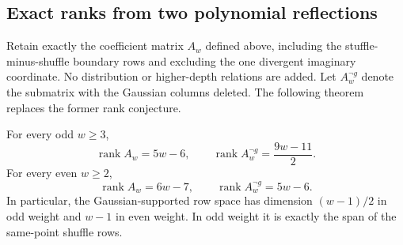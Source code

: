 
\subsection{Exact ranks from two polynomial reflections}
\label{l4rank:sec:rank}
Retain exactly the coefficient matrix $A_w$ defined above, including the
stuffle-minus-shuffle boundary rows and excluding the one divergent imaginary
coordinate. No distribution or higher-depth relations are added. Let
$A_w^{\neg g}$ denote the submatrix with the Gaussian columns deleted.
The following theorem replaces the former rank conjecture.

\begin{theorem}
\label{signed:conj:rank}\label{l4rank:thm:rank}
For every odd $w\ge3$,
\begin{equation}\label{signed:eq:rank-conjecture}
 \operatorname{rank} A_w=5w-6,\qquad
 \operatorname{rank} A_w^{\neg g}=\frac{9w-11}{2}.
\end{equation}
For every even $w\ge2$,
\begin{equation}\label{l4rank:eq:even-rank}
 \operatorname{rank} A_w=6w-7,\qquad
 \operatorname{rank} A_w^{\neg g}=5w-6.
\end{equation}
In particular, the Gaussian-supported row space has dimension $(w-1)/2$
in odd weight and $w-1$ in even weight. In odd weight it is exactly the span
of the same-point shuffle rows.
\end{theorem}

